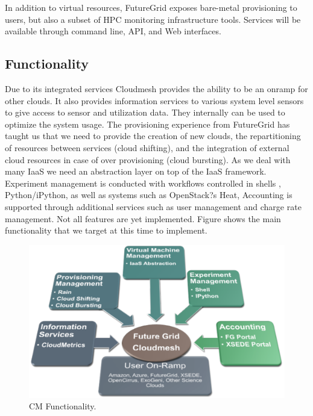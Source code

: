 \documentclass{tex/sig-alternate}
\begin{document}
In addition to virtual resources, FutureGrid exposes bare-metal provisioning to users, but also a subset of HPC monitoring infrastructure tools. Services will be available through command line, API, and Web interfaces.


\subsection{Functionality}


Due to its integrated services Cloudmesh provides the ability to be an onramp for other clouds. It also provides information services to various system level sensors to give access to sensor and utilization data. They internally can be used to optimize the system usage. The provisioning experience from FutureGrid has taught us that we need to provide the creation of new clouds, the repartitioning of resources between services (cloud shifting), and the integration of external cloud resources in case of over provisioning (cloud bursting). As we deal with many IaaS we need an abstraction layer on top of the IaaS framework. Experiment management is conducted with workflows controlled in shells \cite{cmd3}, Python/iPython, as well as systems such as OpenStack?s Heat, Accounting is supported through additional services such as user management and charge rate management. Not all features are yet implemented. Figure \label{F:cm-func} shows the main functionality that we target at this time to implement.


\begin{figure}[htb]
  \centering
    \includegraphics[width=1.0\columnwidth]{images/cm-functionality.pdf}
  \caption{CM Functionality.}\label{F:cm-func}
\end{figure}
\end{document}
